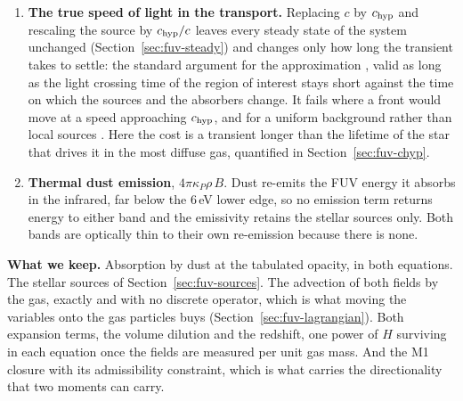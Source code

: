 \begin{enumerate}
    A photon lives, before absorption, for $\tau_{\rm phys} = \lambda/c$,
    which is $10^3$ to $10^5$\,yr over the $\lambda \sim 300$\,pc to
    $30$\,kpc of diffuse gas, against a Hubble time of order
    $10^{10}$\,yr. Its frequency therefore migrates by
    $H\tau_{\rm phys}\sim 10^{-7}$ to $10^{-5}$ of a band width before
    that ONE photon is absorbed: no per-photon book-keeping is needed for
    that. The RUN-INTEGRATED transfer this migration accumulates over
    many e-folds of expansion IS modelled: each band's own lower-edge
    loss (fixed in physical, not comoving, energy) is folded into its
    relaxation depth via a table-borne coefficient
    $\lambda_E(b) \geq 1$, and the two bands being contiguous means the
    Lyman-Werner band's loss at 11.2\,eV is exactly the PE band's gain
    there, transferred directly. Section~\ref{sec:fuv-lagrangian}'s
    $-Hu$ term is the $\lambda_E(b) = 1$ (grey, comoving-edge) special
    case of this; its Step~2 records the sense in which THAT term alone
    bounds the loss from a narrow band, the gap this transfer closes.
  \item \textbf{The true speed of light in the transport.} Replacing $c$
    by $c_{\rm hyp}$ and rescaling the source by $c_{\rm hyp}/c$ leaves
    every steady state of the system unchanged
    (Section~\ref{sec:fuv-steady}) and changes only how long the transient
    takes to settle: the standard argument for the approximation
    \citep{GnedinAbel2001,Rosdahl2013}, valid as long as the light
    crossing time of the region of interest stays short against the time
    on which the sources and the absorbers change. It fails where a front
    would move at a speed approaching $c_{\rm hyp}$, and for a uniform
    background rather than local sources \citep{Gnedin2016}. Here the
    cost is a transient longer than the lifetime of the star that drives
    it in the most diffuse gas, quantified in
    Section~\ref{sec:fuv-chyp}.
  \item \textbf{Thermal dust emission}, $4\pi\kappa_P\rho\,B$. Dust
    re-emits the FUV energy it absorbs in the infrared, far below the
    $6$\,eV lower edge, so no emission term returns energy to either
    band and the emissivity retains the stellar sources only. Both bands
    are optically thin to their own re-emission because there is none.
\end{enumerate}

\textbf{What we keep.} Absorption by dust at the tabulated opacity, in
both equations. The stellar sources of Section~\ref{sec:fuv-sources}. The
advection of both fields by the gas, exactly and with no discrete
operator, which is what moving the variables onto the gas particles buys
(Section~\ref{sec:fuv-lagrangian}). Both expansion terms, the volume
dilution and the redshift, one power of $H$ surviving in each equation
once the fields are measured per unit gas mass. And the M1 closure with
its admissibility constraint, which is what carries the directionality
that two moments can carry.

